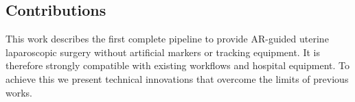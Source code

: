 

\subsection{Contributions}
\label{sec:contributions}
This work describes the first complete pipeline to provide AR-guided uterine laparoscopic surgery without artificial markers or tracking equipment. It is therefore strongly compatible with existing workflows and hospital equipment. To achieve this we present technical innovations that overcome the limits of previous works.%


